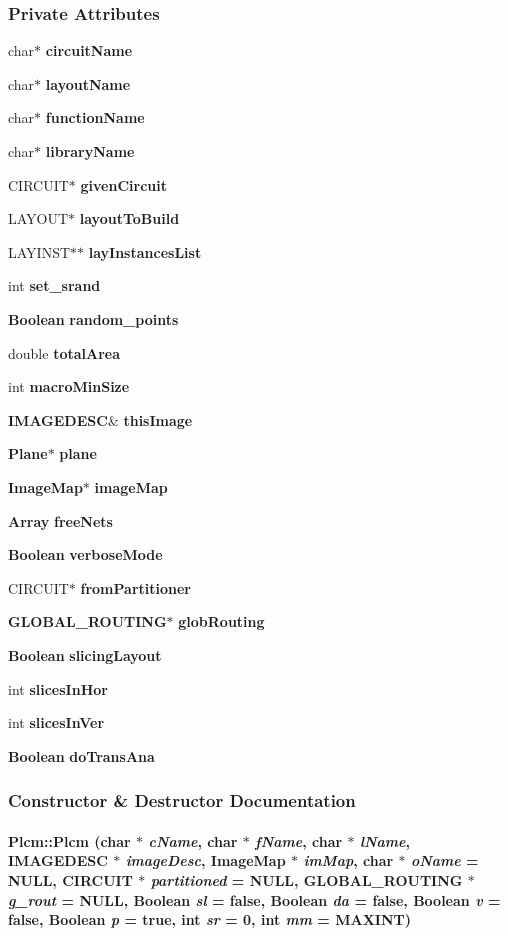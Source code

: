 \subsubsection*{Private Attributes}
\begin{CompactItemize}
\item 
char$\ast$ {\bf circuit\-Name}
\item 
char$\ast$ {\bf layout\-Name}
\item 
char$\ast$ {\bf function\-Name}
\item 
char$\ast$ {\bf library\-Name}
\item 
CIRCUIT$\ast$ {\bf given\-Circuit}
\item 
LAYOUT$\ast$ {\bf layout\-To\-Build}
\item 
LAYINST$\ast$$\ast$ {\bf lay\-Instances\-List}
\item 
int {\bf set\_\-srand}
\item 
{\bf Boolean} {\bf random\_\-points}
\item 
double {\bf total\-Area}
\item 
int {\bf macro\-Min\-Size}
\item 
{\bf IMAGEDESC}\& {\bf this\-Image}
\item 
{\bf Plane}$\ast$ {\bf plane}
\item 
{\bf Image\-Map}$\ast$ {\bf image\-Map}
\item 
{\bf Array} {\bf free\-Nets}
\item 
{\bf Boolean} {\bf verbose\-Mode}
\item 
CIRCUIT$\ast$ {\bf from\-Partitioner}
\item 
{\bf GLOBAL\_\-ROUTING}$\ast$ {\bf glob\-Routing}
\item 
{\bf Boolean} {\bf slicing\-Layout}
\item 
int {\bf slices\-In\-Hor}
\item 
int {\bf slices\-In\-Ver}
\item 
{\bf Boolean} {\bf do\-Trans\-Ana}
\end{CompactItemize}


\subsubsection{Constructor \& Destructor Documentation}
\label{Plcm_a0}
\paragraph{\setlength{\rightskip}{0pt plus 5cm}Plcm::Plcm (char $\ast$ {\em c\-Name}, char $\ast$ {\em f\-Name}, char $\ast$ {\em l\-Name}, {\bf IMAGEDESC} $\ast$ {\em image\-Desc}, {\bf Image\-Map} $\ast$ {\em im\-Map}, char $\ast$ {\em o\-Name} = NULL, CIRCUIT $\ast$ {\em partitioned} = NULL, {\bf GLOBAL\_\-ROUTING} $\ast$ {\em g\_\-rout} = NULL, {\bf Boolean} {\em sl} = false, {\bf Boolean} {\em da} = false, {\bf Boolean} {\em v} = false, {\bf Boolean} {\em p} = true, int {\em sr} = 0, int {\em mm} = MAXINT)}\hfill



